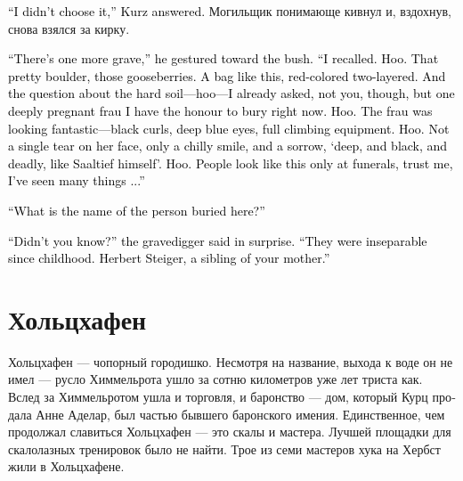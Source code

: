 \documentclass[a4paper,12pt,fleqn]{book}\usepackage{cooltooltips}\usepackage{polyglossia}\setdefaultlanguage[babelshorthands=true]{russian}\setotherlanguage{english}\defaultfontfeatures{Ligatures=TeX,Mapping=tex-text} \usepackage{xcolor}\definecolor{lightgray}{HTML}{bbbbbb}\color{lightgray}\newcommand{\ml}[3]{\textenglish{\textcolor{black}{#3}}}
\begin{document}
\ml{$0$}
{--- Я его не выбирала, --- ответила Курц.}
{``I didn't choose it,'' Kurz answered.}
Могильщик понимающе кивнул и, вздохнув, снова взялся за кирку.

\ml{$0$}
{--- Здесь ещё одна могила, --- он кивнул в сторону куста.}
{``There's one more grave,'' he gestured toward the bush.}
\ml{$0$}
{--- Я вспомнил.}
{``I recalled.}
\ml{$0$}
{Ху.}
{Hoo.}
\ml{$0$}
{И булыжник этот красивый, и смородину.}
{That pretty boulder, those gooseberries.}
\ml{$0$}
{И такой же мешок, красный, двухслойный.}
{A bag like this, red-colored two-layered.}
\ml{$0$}
{И вопрос насчет твёрдой земли --- эх --- я уже задавал, только не вам, а одной глубоко беременной юной фрау, которую имею честь хоронить сейчас.}
{And the question about the hard soil---hoo---I already asked, not you, though, but one deeply pregnant frau I have the honour to bury right now.}
\ml{$0$}
{Ху.}
{Hoo.}
\ml{$0$}
{Фрау выглядела потрясающе --- чёрные кудри, синие глаза, полная скальная экипировка.}
{The frau was looking fantastic---black curls, deep blue eyes, full climbing equipment.}
\ml{$0$}
{Ху.}
{Hoo.}
\ml{$0$}
{На лице ни слезинки, только стылая улыбка и печаль, <<глубокая, чёрная и смертоносная, как Заалтиф>>.}
{Not a single tear on her face, only a chilly smile, and a sorrow, `deep, and black, and deadly, like Saaltief himself'.}
\ml{$0$}
{Ху.}
{Hoo.}
\ml{$0$}
{Так красиво люди выглядят только на похоронах, поверьте мне, я уж много повидал...}
{People look like this only at funerals, trust me, I've seen many things ...''}

\ml{$0$}
{--- Как звали человека, который тут похоронен?}
{``What is the name of the person buried here?''}

\ml{$0$}
{--- А вы не знаете? --- удивился могильщик, обернувшись и поправив шапку.}
{``Didn't you know?'' the gravedigger said in surprise.}
\ml{$0$}
{--- Они были неразлучны с самого детства.}
{``They were inseparable since childhood.}
\ml{$0$}
{Герберт Штайгер, родной брат вашей мамы.}
{Herbert Steiger, a sibling of your mother.''}

\section{Хольцхафен}

Хольцхафен --- чопорный городишко.
Несмотря на название, выхода к воде он не имел --- русло Химмельрота ушло за сотню километров уже лет триста как.
Вслед за Химмельротом ушла и торговля, и баронство --- дом, который Курц продала Анне Аделар, был частью бывшего баронского имения.
Единственное, чем продолжал славиться Хольцхафен --- это скалы и мастера.
Лучшей площадки для скалолазных тренировок было не найти.
Трое из семи мастеров хука на Хербст жили в Хольцхафене.
\end{document}

